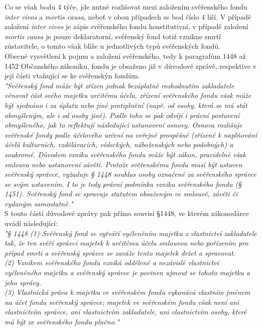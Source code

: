 \documentclass{article}
\begin{document}
Co se však bodu 4 týče, jde nutné rozlišovat mezi založením svěřenského fondu \textit{inter vivos} a \textit{mortis causa}, neboť v obou případech se bod číslo 4 liší. V případě založení \textit{inter vivos} je zápis svěřenského fondu konstitutivní, v případě založení \textit{mortis causa} je pouze deklaratorní, svěřenský fond totiž vznikne smrtí zůstavitele, o tomto však blíže u jednotlivých typů svěřenských fondů.\\

Obecné vysvětlení k pojmu a založení svěřenského, tedy k paragrafům 1448 až 1452 Občanského zákoníku, fondu je obsaženo již v důvodové zprávě, respektive v její části vtahující se ke svěřenskýn fondům.\\

\textit{"Svěřenský fond může být zřízen jednak bezúplatně rozhodnutím zakladatele věnovat část svého majetku určitému účelu, zřízení svěřenského fondu však může být sjednáno i za úplatu nebo jiné protiplnění (např. od osoby, která se má stát obmyšleným, ale i od osoby jiné). Podle toho se pak odvíjí i právní postavení obmyšleného, jak to reflektují následující ustanovení osnovy. Osnova rozlišuje svěřenské fondy podle účelového určení na veřejně prospěšné (zřízené k naplňování účelů kulturních, vzdělávacích, vědeckých, náboženských nebo podobných) a soukromé. Důvodem vzniku svěřenského fondu může být zákon, pravidelně však smlouva nebo ustanovení závěti. Protože svěřenskému fondu musí být ustaven svěřenský správce, vyžaduje § 1448 souhlas osoby označené za svěřenského správce se svým ustavením. I to je tedy právní podmínka vzniku svěřenského fondu (§ 1451). Svěřenský fond se spravuje statutem obsaženým ve smlouvě, závěti či vydaným samostatně."}\\

S touto částí důvodové zprávy pak přímo souvisí §1448, ve kterém zákonodárce uvádí následující:\\

\textit{"§ 1448
(1) Svěřenský fond se vytváří vyčleněním majetku z vlastnictví zakladatele tak, že ten svěří správci majetek k určitému účelu smlouvou nebo pořízením pro případ smrti a svěřenský správce se zaváže tento majetek držet a spravovat.\\
(2) Vznikem svěřenského fondu vzniká oddělené a nezávislé vlastnictví vyčleněného majetku a svěřenský správce je povinen ujmout se tohoto majetku a jeho správy.\\
(3) Vlastnická práva k majetku ve svěřenském fondu vykonává vlastním jménem na účet fondu svěřenský správce; majetek ve svěřenském fondu však není ani vlastnictvím správce, ani vlastnictvím zakladatele, ani vlastnictvím osoby, které má být ze svěřenského fondu plněno."}\\
\end{document}
